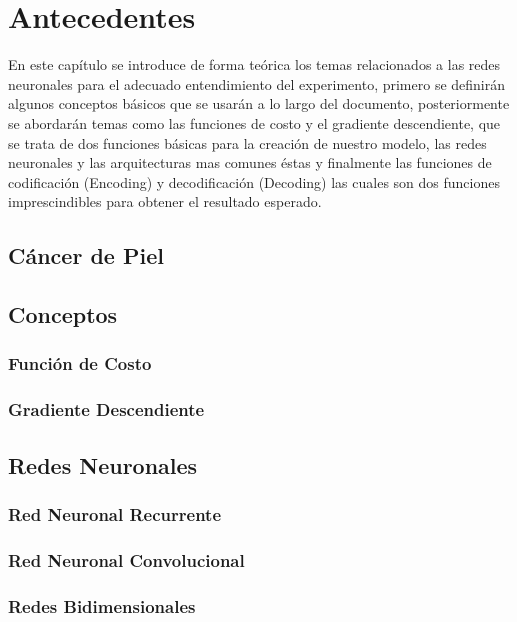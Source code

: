 
\chapter{Antecedentes}
En este capítulo se introduce de forma teórica los temas relacionados a las redes neuronales para el adecuado entendimiento del experimento, primero se definirán algunos conceptos básicos que se usarán a lo largo del documento, posteriormente se abordarán temas como las funciones de costo y el gradiente descendiente, que se trata de dos funciones básicas para la creación de nuestro modelo, las redes neuronales y las arquitecturas mas comunes éstas y finalmente las funciones de codificación (Encoding) y decodificación (Decoding) las cuales son dos funciones imprescindibles para obtener el resultado esperado.


\section{Cáncer de Piel} 

\section{Conceptos}

\subsection{Función de Costo}

\subsection{Gradiente Descendiente}

\section{Redes Neuronales}

\subsection{Red Neuronal Recurrente}

\subsection{Red Neuronal Convolucional}

\subsection{Redes Bidimensionales}

